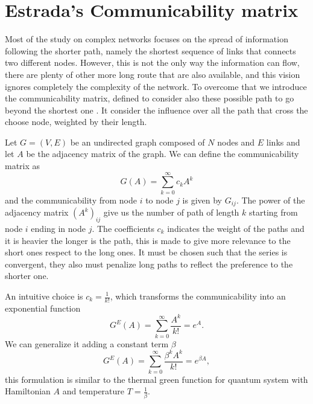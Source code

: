 \section{Estrada's Communicability matrix}

Most of the study on complex networks focuses on the spread of information following the shorter path, namely the shortest sequence of links that connects two different nodes. 
However, this is not the only way the information can flow, there are plenty of other more long route that are also available, and this vision ignores completely the complexity of the network.
To overcome that we introduce the communicability matrix, defined to consider also these possible path to go beyond the shortest one \cite{Estrada_2012}. It consider the influence over all the path that cross the choose node, weighted by their length.

Let $G=(V,E)$ be an undirected graph composed of $N$ nodes and $E$ links and let $A$ be the adjacency matrix of the graph.
We can define the communicability matrix as
\begin{equation}
    G(A) = \sum_{k=0}^{\infty}c_k A^k
\end{equation}
and the communicability from node $i$ to node $j$ is given by $G_{ij}$. The power of the adjacency matrix $(A^k)_{ij}$ give us the number of path of length $k$ starting from node $i$ ending in node $j$.
The coefficients $c_k$ indicates the weight of the paths and it is heavier the longer is the path, this is made to give more relevance to the short ones respect to the long ones. It must be chosen such that the series is convergent, they also must penalize long paths to reflect the preference to the shorter one.

An intuitive choice is $c_k = \frac{1}{k!}$, which transforms the communicability into an exponential function \cite{Estrada_2008}
\begin{equation}\label{G_E}
    G^E(A) =\sum_{k=0}^{\infty} \frac{A^k}{k!} = e^{A} .
\end{equation}
We can generalize it adding a constant term $\beta$
\begin{equation}
    G^E(A) =\sum_{k=0}^{\infty} \frac{\beta^k A^k}{k!} = e^{\beta A} ,
\end{equation}
this formulation is similar to the thermal green function for quantum system with Hamiltonian $A$ and temperature $T = \frac{1}{\beta}$.

